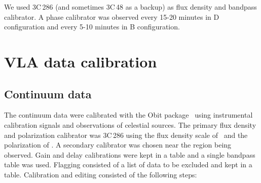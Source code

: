 \documentclass{aa}
\begin{document}
We used 3C\,286 (and sometimes 3C\,48 as a backup) as flux density and bandpass calibrator. A phase calibrator was
observed every 15-20 minutes in D configuration and every 5-10 minutes in B configuration.





\section{VLA data calibration}
\subsection{Continuum data}

The continuum data were calibrated with the Obit package~\citep{Cotton2008} using instrumental calibration signals and observations of celestial sources. The primary flux density and polarization calibrator was 3C\,286 using the flux density scale of~\cite{PerleyButler2013a} and the
polarization of \cite{PerleyButler2013b}. A secondary calibrator was chosen near the region being observed. Gain and delay calibrations were kept in a table and a single bandpass table was used. Flagging consisted of a list of data to be excluded and kept in a table. Calibration and editing consisted of the following steps: 
\end{document}
